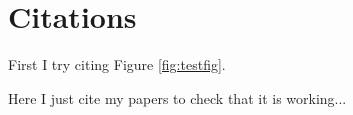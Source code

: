 \documentclass[a4paper,english,11pt,reqno,oneside]{amsart}
\theoremstyle{theorem}
\numberwithin{equation}{section}
\numberwithin{figure}{section}
\numberwithin{table}{section}
\begin{document}
\section{Citations}
\label{sec:Appendix}

First I try citing Figure \ref{fig:testfig}.

Here I just cite my papers to check that it is working...

\citet{MJ_FICnp16}

\citet{MJ_CoxFIC16}

\citet{MJ_TimeSeriesFIC16}

\citet{MJ_ApproxBayes16}

\citet{MJ_LeadingEdge16}

\citet{MJ_TimeSeriesFICRio15}

\citet{MJ_EAPetroleum_Geostat2015}





\end{document}
